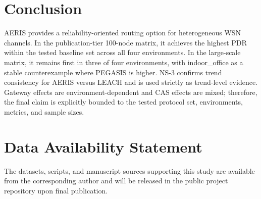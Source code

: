 \documentclass[sensors,article,submit,moreauthors,pdftex]{Definitions/mdpi}
\begin{document}
\section{Conclusion}
AERIS provides a reliability-oriented routing option for heterogeneous WSN channels. In the publication-tier 100-node matrix, it achieves the highest PDR within the tested baseline set across all four environments. In the large-scale matrix, it remains first in three of four environments, with indoor\_office as a stable counterexample where PEGASIS is higher. NS-3 confirms trend consistency for AERIS versus LEACH and is used strictly as trend-level evidence. Gateway effects are environment-dependent and CAS effects are mixed; therefore, the final claim is explicitly bounded to the tested protocol set, environments, metrics, and sample sizes.

\section*{Data Availability Statement}
The datasets, scripts, and manuscript sources supporting this study are available from the corresponding author and will be released in the public project repository upon final publication.


\end{document}
